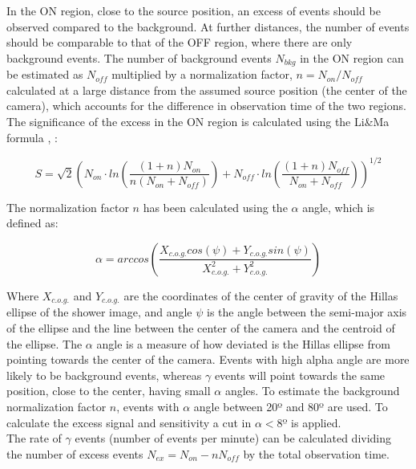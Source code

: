 \documentclass[main.tex]{subfiles}
\begin{document}
In the ON region, close to the source position, an excess of events should be observed compared to the background. At further distances, the number of events should be comparable to that of the OFF region, where there are only background events. The number of background events $N_{bkg}$ in the ON region can be estimated as $N_{off}$ multiplied by a normalization factor, $n = N_{on}/N_{off}$ calculated at a large distance from the assumed source position (the center of the camera), which accounts for the difference in observation time of the two regions. The significance of the excess in the ON region is calculated using the Li\&Ma formula \cite{1983LiMa}, \cite{2005LiMa}: 

\begin{equation}
  S = \sqrt{2} \left(N_{on}\cdot ln\left( \frac{(1+n)N_{on}}{n(N_{on}+N_{off})}\right)+N_{off}\cdot ln\left( \frac{(1+n)N_{off}}{N_{on}+N_{off}}\right) \right)^{1/2} 
\end{equation}

The normalization factor $n$ has been calculated using the $\alpha$ angle, which is defined as:

\begin{equation}
  \alpha = arc cos\left(\frac{X_{c.o.g.}cos(\psi) + Y_{c.o.g.} sin(\psi)}{X_{c.o.g.}^2 + Y_{c.o.g.}^2}\right)
\end{equation}

Where $X_{c.o.g.}$ and $Y_{c.o.g.}$ are the coordinates of the center of gravity of the Hillas ellipse of the shower image, and angle $\psi$ is the angle between the semi-major axis of the ellipse and the line between the center of the camera and the centroid of the ellipse. The $\alpha$ angle is a measure of how deviated is the Hillas ellipse from pointing towards the center of the camera. Events with high alpha angle are more likely to be background events, whereas $\gamma$ events will point towards the same position, close to the center, having small $\alpha$ angles. To estimate the background normalization factor $n$, events with $\alpha$ angle between 20º and 80º are used. To calculate the excess signal and sensitivity a cut in $\alpha < 8º$ is applied.\\
The rate of $\gamma$ events (number of events per minute) can be calculated dividing the number of excess events $N_{ex}=N_{on}-n N_{off}$ by the total observation time.\\
\end{document}
